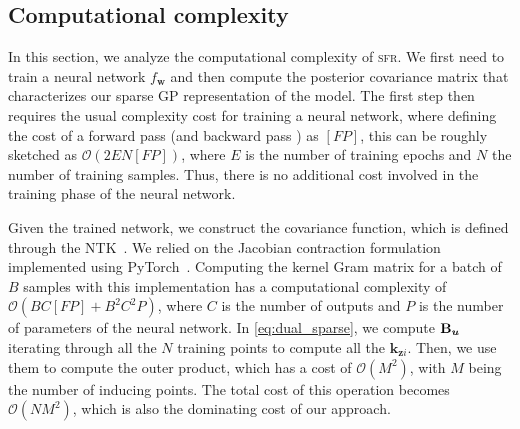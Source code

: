 \documentclass{article} %
\newcommand{\our}{\textsc{sfr}\xspace}
\newcommand{\weights}{\ensuremath{\mathbf{w}}}
\newcommand{\mbf}[1]{\mathbf{#1}}
\newcommand{\MB}{\mbf{B}}
\newcommand{\vkzi}{\mbf{k}_{\mbf{z}i}}
\begin{document}

\subsection{Computational complexity}
\label{app:comp_compl}
In this section, we analyze the computational complexity of \our. We first need to train a neural network $f_\weights$ and then compute the posterior covariance matrix that characterizes our sparse GP representation of the model. The first step then requires the usual complexity cost for training a neural network, where defining the cost of a forward pass (and backward pass
) as $[F\!P]$, this can be roughly sketched as $\mathcal{O}(2  E  N[F\!P])$, where $E$ is the number of training epochs and  $N$ the number of training samples. Thus, there is no additional cost involved in the training phase of the neural network.

Given the trained network, we construct the covariance function, which is defined through the NTK~\citep{jacot2018neural}. We relied on the Jacobian contraction formulation implemented using PyTorch~\citep{paszke2019pytorch}. Computing the kernel Gram matrix for a batch of $B$ samples with this implementation has a computational complexity of $\mathcal{O}( B C [F\!P] + B^2 C^2 P)$, where $C$ is the number of outputs and $P$ is the number of parameters of the neural network. In \cref{eq:dual_sparse}, we compute $\MB_\vu$ iterating through all the $N$ training points to compute all the $\vkzi$. Then, we use them to compute the outer product, which has a cost of $\mathcal{O}(M^2)$, with $M$ being the number of inducing points. The total cost of this operation becomes $\mathcal{O}(N M^2)$, which is also the dominating cost of our approach.
\end{document}
